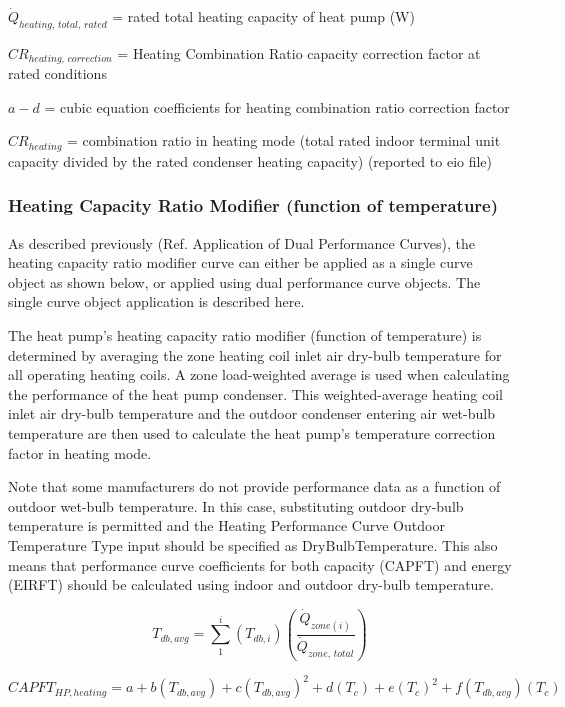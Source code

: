 \(\dot{Q}_{heating,\,total,\,rated}\) = rated total heating capacity of heat pump (W)

\(CR_{heating,\,correction}\) = Heating Combination Ratio capacity correction factor at rated conditions

\(a - d\) = cubic equation coefficients for heating combination ratio correction factor

\(CR_{heating}\) = combination ratio in heating mode (total rated indoor terminal unit capacity divided by the rated condenser heating capacity) (reported to eio file)

\subsubsection{Heating Capacity Ratio Modifier (function of temperature)}\label{heating-capacity-ratio-modifier-function-of-temperature}

As described previously (Ref. Application of Dual Performance Curves), the heating capacity ratio modifier curve can either be applied as a single curve object as shown below, or applied using dual performance curve objects. The single curve object application is described here.

The heat pump's heating capacity ratio modifier (function of temperature) is determined by averaging the zone heating coil inlet air dry-bulb temperature for all operating heating coils. A zone load-weighted average is used when calculating the performance of the heat pump condenser. This weighted-average heating coil inlet air dry-bulb temperature and the outdoor condenser entering air wet-bulb temperature are then used to calculate the heat pump's temperature correction factor in heating mode.

Note that some manufacturers do not provide performance data as a function of outdoor wet-bulb temperature. In this case, substituting outdoor dry-bulb temperature is permitted and the Heating Performance Curve Outdoor Temperature Type input should be specified as DryBulbTemperature. This also means that performance curve coefficients for both capacity (CAPFT) and energy (EIRFT) should be calculated using indoor and outdoor dry-bulb temperature.

\begin{equation}
  T_{db,avg} = \sum\limits_1^i \left( T_{db,i} \right) \left( \frac{\dot{Q}_{zone(i)}}{\dot{Q}_{zone,\,total}} \right)
\end{equation}

\begin{equation}
  CAPFT_{HP,heating} = a + b \left( T_{db,avg} \right) + c \left( T_{db,avg} \right)^2 + d \left( T_c \right) + e \left( T_c \right)^2 + f \left( T_{db,avg} \right) \left( T_c \right)
\end{equation}


